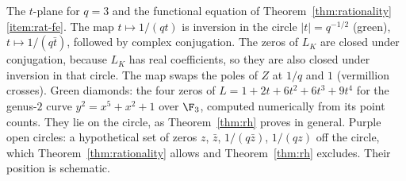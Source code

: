 \caption{The $t$-plane for $q=3$ and the functional equation of
Theorem~\ref{thm:rationality}\eqref{item:rat-fe}. The map
$t\mapsto1/(qt)$ is inversion in the circle $\lvert t\rvert=q^{-1/2}$
(green), $t\mapsto1/(q\bar t)$, followed by complex conjugation. The zeros
of $L_K$ are closed under conjugation, because $L_K$ has real
coefficients, so they are also closed under inversion in that circle. The
map swaps the poles of $Z$ at $1/q$ and $1$ (vermillion crosses). Green
diamonds: the four zeros of $L=1+2t+6t^2+6t^3+9t^4$ for the genus-$2$
curve $y^2=x^5+x^2+1$ over $\F_3$, computed numerically from its point
counts. They lie on the circle,
as Theorem~\ref{thm:rh} proves in general. Purple open circles: a
hypothetical set of zeros $z$, $\bar z$, $1/(q\bar z)$, $1/(qz)$ off the
circle, which Theorem~\ref{thm:rationality} allows and
Theorem~\ref{thm:rh} excludes. Their position is schematic.}
\label{fig:zeta-plane}
